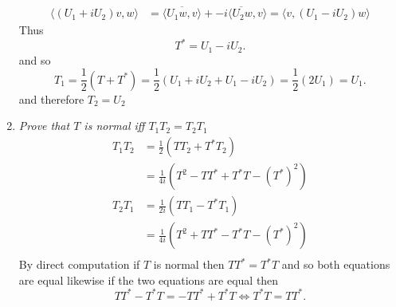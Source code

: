 \documentclass{article}
\begin{document}
\begin{enumerate}[label = (\alph*)]
\begin{align*}
                \langle (U_1 + iU_2) v , w \rangle &= \overline{\langle U_1 w, v \rangle} + \overline{-i \langle U_2 w, v \rangle} = \langle v, (U_1 - i U_2 )w  \rangle
            \end{align*}
            Thus 
            \[
            T^{*} = U_1 -i U_2
            .\] 
            and so
            \[
            T_1 = \frac{1}{2}(T + T^{*}) = \frac{1}{2}(U_1 + iU_2 + U_1 - iU_2) = \frac{1}{2}(2U_1) = U_1
            .\] 
            and therefore $T_2 = U_2$ 
        \item \emph{Prove that $T$ is normal iff $T_1T_2 = T_2T_1$}
            \begin{align*}
                T_1T_2 &= \frac{1}{2}(TT_2 + T^{*}T_2)\\
                       &= \frac{1}{4i}(T^2 - TT^{*}+T^{*}T - (T^{*})^{2})\\
                T_2T_1 &= \frac{1}{2i}(TT_1 - T^{*}T_1)\\
                       &= \frac{1}{4i}(T^2 + TT^{*} - T^{*}T - (T^{*})^2)\\
            \end{align*}
            By direct computation if $T$ is normal then $TT^{*} = T^{*}T$ and so both equations are equal
            likewise if the two equations are equal then
             \[
            TT^{*} - T^{*}T =  - TT^{*} + T^{*}T \iff T^{*}T = TT^{*}
            .\] 
    \end{enumerate}
\end{document}
